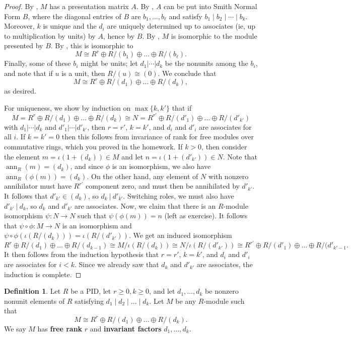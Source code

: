 \documentclass[12pt]{report}
\numberwithin{equation}{section}
\numberwithin{theorem}{chapter}
\theoremstyle{definition}
\newtheorem{definition}[theorem]{Definition}
\newtheorem*{basic properties}{Basic Properties}
\newtheorem*{Important Remark}{Important Remark}
\newcommand{\df}[1]{{\bf #1}\index{#1}}
\DeclareMathOperator{\ann}{ann}
\begin{document}
\begin{proof}
By , $M$ has a presentation matrix $A$. By , $A$ can be put into Smith Normal Form $B$, where the diagonal entries of $B$ are $b_1, \ldots, b_\ell$ and satisfy $b_1 \mid b_2 \mid \cdots \mid b_k$. Moreover, $k$ is unique and the $d_i$ are uniquely determined up to associates (ie, up to multiplication by units) by $A$, hence by $B$. By , $M$ is isomorphic to the module presented by $B$. 
By , this is isomorphic to 
$$M \cong R^r \oplus R/(b_1) \oplus \dots \oplus R/(b_\ell).$$
Finally, some of these $b_i$ might be units; let $d_1 | \cdots | d_k$ be the nonunits among the $b_i$, and note that if $u$ is a unit, then $R/(u) \cong (0)$. We conclude that
$$M \cong R^r \oplus R/(d_1) \oplus \dots \oplus R/(d_k),$$
as desired.

For uniqueness, we show by induction on $\max\{k,k'\}$ that if 
\[M = R^r \oplus R/(d_1) \oplus \dots \oplus R/(d_k) \cong N= R^{r'} \oplus R/(d'_1) \oplus \dots \oplus R/(d'_{k'})\]
with $d_1 | \cdots  | d_k$ and $d'_1 | \cdots | d'_{k'}$, then $r=r'$,  $k=k'$, and $d_i$ and $d'_i$ are associates for all $i$. If $k=k'=0$ then this follows from invariance of rank for free modules over commutative rings, which you proved in the homework. If $k>0$, then consider the element $m=\iota(1+(d_k))\in M$ and let $n=\iota(1+(d'_{k'}))\in N$. Note that $\ann_R(m)= (d_k)$, and since $\phi$ is an isomorphism, we also have $\ann_R(\phi(m))= (d_k)$. On the other hand, any element of $N$ with nonzero annihilator must have $R^{r'}$ component zero, and must then be annihilated by $d'_{k'}$. It follows that $d'_{k'}\in (d_k)$, so $d_k \ | \ d'_{k'}$. Switching roles, we must also have $d'_{k'} \ | \ d_k$, so $d_k$ and $d'_{k'}$ are associates. Now, we claim that there is an $R$-module isomorphism $\psi: N \to N$ such that $\psi(\phi(m)) = n$ (left as exercise). It follows that $\psi \circ \phi: M\to N$ is an isomorphism and $\psi\circ \phi(\iota(R/(d_k))) = \iota(R/(d'_{k'}))$. We get an induced isomorphism
\[ R^r \oplus R/(d_1) \oplus \dots \oplus R/(d_{k-1}) \cong M/ \iota(R/(d_k)) \cong N/ \iota(R/(d'_{k'})) \cong R^{r'} \oplus R/(d'_1) \oplus \dots \oplus R/(d'_{k'-1}.\]
It then follows from the induction hypothesis that $r=r'$, $k=k'$, and $d_i$ and $d'_i$ are associates for $i<k$. Since we already saw that $d_k$ and $d'_{k'}$ are associates, the induction is complete.
\end{proof}

\begin{definition} 
Let $R$ be a PID, let $r \geqslant 0, k \geqslant 0$, and let $d_1,\ldots, d_k$ be nonzero nonunit elements of $R$ satisfying $d_1 \mid d_2 \mid \dots \mid d_k$. Let $M$ be any $R$-module such that 
$$M \cong R^r \oplus R/(d_1) \oplus \dots \oplus R/(d_k).$$ 
We say $M$ has \df{free rank} $r$ and \df{invariant factors} $d_1,\ldots,d_k$.
\end{definition}
\end{document}
